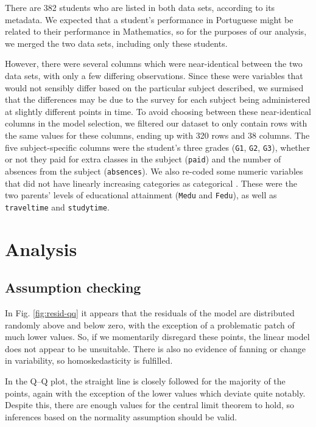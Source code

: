 \documentclass[a4paper,9pt,twocolumn,twoside,]{pinp}
\begin{document}
There are 382 students who are listed in both data sets, according to
its metadata. We expected that a student's performance in Portuguese
might be related to their performance in Mathematics, so for the
purposes of our analysis, we merged the two data sets, including only
these students.

However, there were several columns which were near-identical between
the two data sets, with only a few differing observations. Since these
were variables that would not sensibly differ based on the particular
subject described, we surmised that the differences may be due to the
survey for each subject being administered at slightly different points
in time. To avoid choosing between these near-identical columns in the
model selection, we filtered our dataset to only contain rows with the
same values for these columns, ending up with 320 rows and 38 columns.
The five subject-specific columns were the student's three grades
(\texttt{G1}, \texttt{G2}, \texttt{G3}), whether or not they paid for
extra classes in the subject (\texttt{paid}) and the number of absences
from the subject (\texttt{absences}). We also re-coded some numeric
variables that did not have linearly increasing categories as
categorical . These were the two parents' levels of educational
attainment (\texttt{Medu} and \texttt{Fedu}), as well as
\texttt{traveltime} and \texttt{studytime}.

\hypertarget{analysis}{%
\section{Analysis}\label{analysis}}

\hypertarget{assumption-checking}{%
\subsection{Assumption checking}\label{assumption-checking}}

In Fig. \ref{fig:resid-qq} it appears that the residuals of the model
are distributed randomly above and below zero, with the exception of a
problematic patch of much lower values. So, if we momentarily disregard
these points, the linear model does not appear to be unsuitable. There
is also no evidence of fanning or change in variability, so
homoskedasticity is fulfilled.

In the Q--Q plot, the straight line is closely followed for the majority
of the points, again with the exception of the lower values which
deviate quite notably. Despite this, there are enough values for the
central limit theorem to hold, so inferences based on the normality
assumption should be valid.
\end{document}
